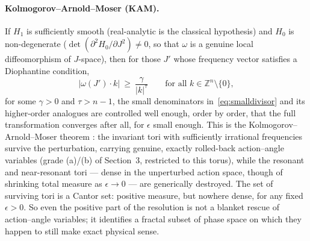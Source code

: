 \documentclass[11pt]{article}
\begin{document}
\paragraph{Kolmogorov--Arnold--Moser (KAM).} If $H_1$ is sufficiently smooth (real-analytic is the classical hypothesis) and $H_0$ is non-degenerate ($\det(\partial^2H_0/\partial J^2)\neq0$, so that $\omega$ is a genuine local diffeomorphism of $J$-space), then for those $J'$ whose frequency vector satisfies a Diophantine condition,
\begin{equation}
|\omega(J')\cdot k|\ \ge\ \frac{\gamma}{|k|^{\tau}}\qquad\text{for all }k\in\mathbb Z^n\setminus\{0\},
\label{eq:diophantine}
\end{equation}
for some $\gamma>0$ and $\tau>n-1$, the small denominators in~\eqref{eq:smalldivisor} and its higher-order analogues are controlled well enough, order by order, that the full transformation converges after all, for $\epsilon$ small enough. This is the Kolmogorov--Arnold--Moser theorem \cite{Kolmogorov1954,Arnold1963,Moser1962}: the invariant tori with sufficiently irrational frequencies survive the perturbation, carrying genuine, exactly rolled-back action--angle variables (grade (a)/(b) of Section~3, restricted to this torus), while the resonant and near-resonant tori --- dense in the unperturbed action space, though of shrinking total measure as $\epsilon\to0$ --- are generically destroyed. The set of surviving tori is a Cantor set: positive measure, but nowhere dense, for any fixed $\epsilon>0$. So even the positive part of the resolution is not a blanket rescue of action--angle variables; it identifies a fractal subset of phase space on which they happen to still make exact physical sense.
\end{document}
